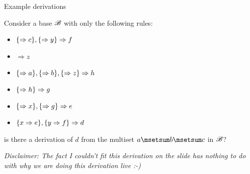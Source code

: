 \documentclass{beamer}
\begin{document}
\begin{frame}{Example derivations}
	\begin{example}
		Consider a base $\mathscr{B}$ with only the following rules:
		\begin{itemize}
			\item $\{\Rightarrow c\},\{\Rightarrow y\}\Rightarrow f$
			\item $\Rightarrow z$
			\item $\{ \Rightarrow a\},\{ \Rightarrow b\},\{\Rightarrow z\}\Rightarrow h$
			\item $\{\Rightarrow h\}\Rightarrow g$
			\item $\{\Rightarrow x\},\{\Rightarrow g\}\Rightarrow e$
			\item $\{ x\Rightarrow e\},\{ y\Rightarrow f\}\Rightarrow d$
		\end{itemize}
		is there a derivation of $d$ from the multiset $a\msetsum b\msetsum c$ in $\mathscr{B}$?
	\end{example}
	\pause 
	\emph{Disclaimer: The fact I couldn't fit this derivation on the slide has nothing to do with why we are doing this derivation live :-)}
\end{frame}
\end{document}
